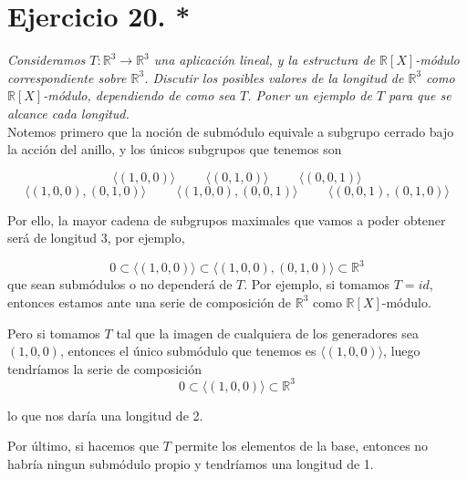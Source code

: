 \section{Ejercicio 20. *} \textit{Consideramos \(T:\mathbb{R}^3 \to
  \mathbb{R}^3\) una aplicación lineal, y la estructura de
  \(\mathbb{R}[X]\)-módulo correspondiente sobre \(\mathbb{R}^3\). Discutir los
  posibles valores de la longitud de \(\mathbb{R}^3\) como
  \(\mathbb{R}[X]\)-módulo, dependiendo de como sea \(T\). Poner un ejemplo de
  \(T\) para que se alcance cada longitud.}\\

Notemos primero que la noción de submódulo equivale a subgrupo cerrado bajo la
acción del anillo, y los únicos subgrupos que tenemos son

\[
   \langle (1,0,0) \rangle \hspace{1cm}  \langle (0,1,0) \rangle \hspace{1cm} \langle (0,0,1) \rangle
\]
\[
  \langle (1,0,0),(0,1,0) \rangle \hspace{1cm}\langle (1,0,0),(0,0,1) \rangle \hspace{1cm}\langle (0,0,1),(0,1,0) \rangle
\]


Por ello, la mayor cadena de subgrupos maximales que vamos a
poder obtener será de longitud 3, por ejemplo,

\[
  0 \subset \langle (1,0,0) \rangle \subset \langle (1,0,0),(0,1,0) \rangle
  \subset \mathbb{R}^3
\]
que sean submódulos o no dependerá de \(T\). Por ejemplo, si tomamos \(T = id\),
entonces estamos ante una serie de composición de \(\mathbb{R}^3\) como
\(\mathbb{R}[X]\)-módulo.

Pero si tomamos \(T\) tal que la imagen de cualquiera de los generadores sea
\((1,0,0)\), entonces el único submódulo que tenemos es \(\langle (1,0,0)
\rangle\), luego tendríamos la serie de composición
\[
  0 \subset \langle (1,0,0) \rangle \subset \mathbb{R}^3
\]

lo que nos daría una longitud de 2.

Por último, si hacemos que \(T\) permite los elementos de la base, entonces no
habría ningun submódulo propio y tendríamos una longitud de 1.
